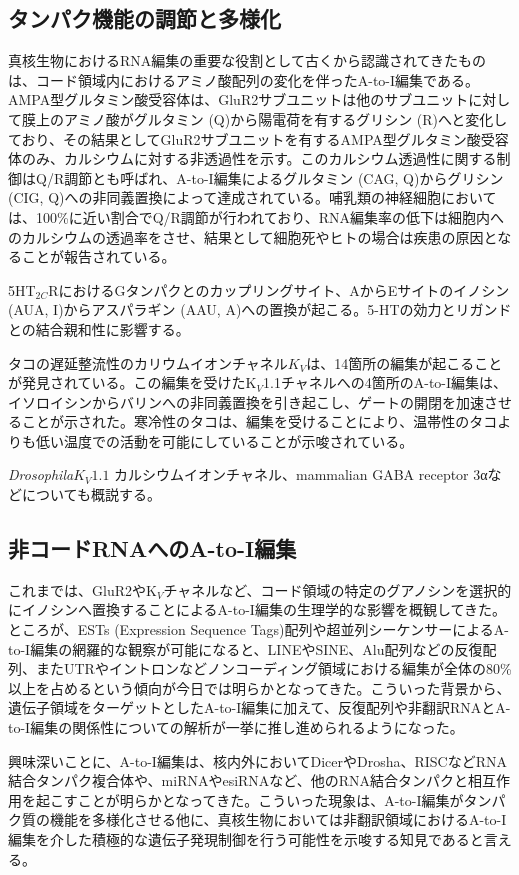 \subsection{タンパク機能の調節と多様化}
真核生物におけるRNA編集の重要な役割として古くから認識されてきたものは、コード領域内におけるアミノ酸配列の変化を伴ったA-to-I編集である。AMPA型グルタミン酸受容体は、GluR2サブユニットは他のサブユニットに対して膜上のアミノ酸がグルタミン (Q)から陽電荷を有するグリシン (R)へと変化しており、その結果としてGluR2サブユニットを有するAMPA型グルタミン酸受容体のみ、カルシウムに対する非透過性を示す。このカルシウム透過性に関する制御はQ/R調節とも呼ばれ、A-to-I編集によるグルタミン (CAG, Q)からグリシン (CIG, Q)への非同義置換によって達成されている。哺乳類の神経細胞においては、100\%に近い割合でQ/R調節が行われており、RNA編集率の低下は細胞内へのカルシウムの透過率をさせ、結果として細胞死やヒトの場合は疾患の原因となることが報告されている。
\par
5HT$_{2C}$RにおけるGタンパクとのカップリングサイト、AからEサイトのイノシン (AUA, I)からアスパラギン (AAU, A)への置換が起こる。5-HTの効力とリガンドとの結合親和性に影響する。
\par
タコの遅延整流性のカリウムイオンチャネル$K_{V}$は、14箇所の編集が起こることが発見されている。この編集を受けたK$_{V}$1.1チャネルへの4箇所のA-to-I編集は、イソロイシンからバリンへの非同義置換を引き起こし、ゲートの開閉を加速させることが示された。寒冷性のタコは、編集を受けることにより、温帯性のタコよりも低い温度での活動を可能にしていることが示唆されている。

\textit{Drosophila}$K_{V}1.1$ カルシウムイオンチャネル、mammalian GABA receptor 3αなどについても概説する。

\subsection{非コードRNAへのA-to-I編集}
これまでは、GluR2やK$_{V}$チャネルなど、コード領域の特定のグアノシンを選択的にイノシンへ置換することによるA-to-I編集の生理学的な影響を概観してきた。ところが、ESTs (Expression Sequence Tags)配列や超並列シーケンサーによるA-to-I編集の網羅的な観察が可能になると、LINEやSINE、Alu配列などの反復配列、またUTRやイントロンなどノンコーディング領域における編集が全体の80\%以上を占めるという傾向が今日では明らかとなってきた。こういった背景から、遺伝子領域をターゲットとしたA-to-I編集に加えて、反復配列や非翻訳RNAとA-to-I編集の関係性についての解析が一挙に推し進められるようになった。
\par
興味深いことに、A-to-I編集は、核内外においてDicerやDrosha、RISCなどRNA結合タンパク複合体や、miRNAやesiRNAなど、他のRNA結合タンパクと相互作用を起こすことが明らかとなってきた。こういった現象は、A-to-I編集がタンパク質の機能を多様化させる他に、真核生物においては非翻訳領域におけるA-to-I編集を介した積極的な遺伝子発現制御を行う可能性を示唆する知見であると言える。

